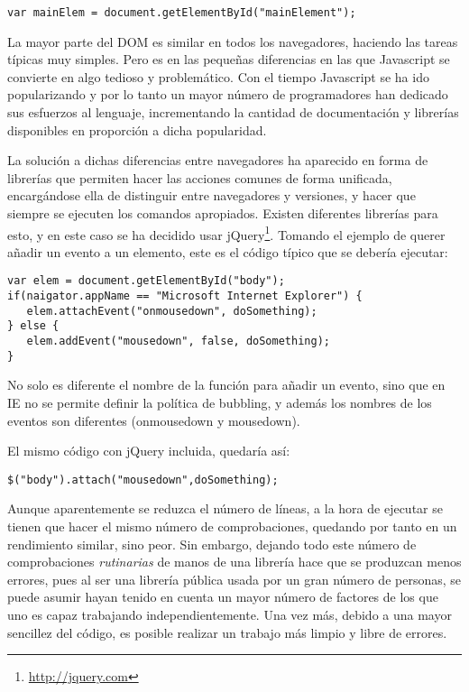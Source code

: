 \begin{verbatim}
var mainElem = document.getElementById("mainElement");
\end{verbatim}

La mayor parte del DOM es similar en todos los navegadores, haciendo las tareas típicas muy simples. Pero es en las pequeñas diferencias en las que Javascript se convierte en algo tedioso y problemático. Con el tiempo Javascript se ha ido popularizando y por lo tanto un mayor número de programadores han dedicado sus esfuerzos al lenguaje, incrementando la cantidad de documentación y librerías disponibles en proporción a dicha popularidad.

La solución a dichas diferencias entre navegadores ha aparecido en forma de librerías que permiten hacer las acciones comunes de forma unificada, encargándose ella de distinguir entre navegadores y versiones, y hacer que siempre se ejecuten los comandos apropiados. Existen diferentes librerías para esto, y en este caso se ha decidido usar jQuery\footnote{\url{http://jquery.com}}. Tomando el ejemplo de querer añadir un evento a un elemento, este es el código típico que se debería ejecutar:

\begin{verbatim}
var elem = document.getElementById("body");
if(naigator.appName == "Microsoft Internet Explorer") {
   elem.attachEvent("onmousedown", doSomething);
} else {
   elem.addEvent("mousedown", false, doSomething);
}
\end{verbatim}

No solo es diferente el nombre de la función para añadir un evento, sino que en IE no se permite definir la política de bubbling, y además los nombres de los eventos son diferentes (onmousedown y mousedown).

El mismo código con jQuery incluida, quedaría así:

\begin{verbatim}
$("body").attach("mousedown",doSomething);
\end{verbatim}

Aunque aparentemente se reduzca el número de líneas, a la hora de ejecutar se tienen que hacer el mismo número de comprobaciones, quedando por tanto en un rendimiento similar, sino peor. Sin embargo, dejando todo este número de comprobaciones \emph{rutinarias} de manos de una librería hace que se produzcan menos errores, pues al ser una librería pública usada por un gran número de personas, se puede asumir hayan tenido en cuenta un mayor número de factores de los que uno es capaz trabajando independientemente. Una vez más, debido a una mayor sencillez del código, es posible realizar un trabajo más limpio y libre de errores.

